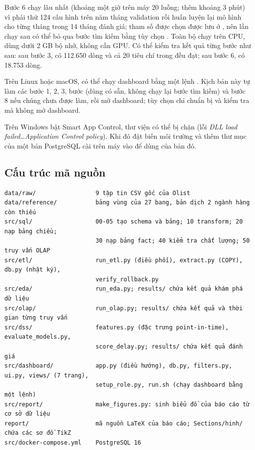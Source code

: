 Bước 6 chạy lâu nhất (khoảng một giờ trên máy 20 luồng;  thêm khoảng 3 phút) vì phải thử 124 cấu hình trên năm tháng validation rồi huấn luyện lại mô hình cho từng tháng trong 14 tháng đánh giá; tham số được chọn được lưu ở , nên lần chạy sau có thể bỏ qua bước tìm kiếm bằng tùy chọn . Toàn bộ chạy trên CPU, dùng dưới 2 GB bộ nhớ, không cần GPU. Có thể kiểm tra kết quả từng bước như sau: sau bước 3,  có 112.650 dòng và cả 20 tiêu chí trong  đều đạt; sau bước 6,  có 18.753 dòng.

Trên Linux hoặc macOS, có thể chạy dashboard bằng một lệnh . Kịch bản này tự làm các bước 1, 2, 3, bước  (dùng  có sẵn, không chạy lại bước tìm kiếm) và bước 8 nếu chúng chưa được làm, rồi mở dashboard; tùy chọn  chỉ chuẩn bị và kiểm tra mà không mở dashboard.

Trên Windows bật Smart App Control, thư viện  có thể bị chặn (lỗi \textit{DLL load failed\ldots Application Control policy}). Khi đó đặt biến môi trường  và thêm thư mục  của một bản PostgreSQL cài trên máy vào  để dùng  của bản đó.

\subsection{Cấu trúc mã nguồn}

\begin{lstlisting}[style=SQLStyle, language={}]
data/raw/                 9 tập tin CSV gốc của Olist
data/reference/           bảng vùng của 27 bang, bản dịch 2 ngành hàng còn thiếu
src/sql/                  00-05 tạo schema và bảng; 10 transform; 20 nạp bảng chiều;
                          30 nạp bảng fact; 40 kiểm tra chất lượng; 50 truy vấn OLAP
src/etl/                  run_etl.py (điều phối), extract.py (COPY), db.py (nhật ký),
                          verify_rollback.py
src/eda/                  run_eda.py; results/ chứa kết quả khám phá dữ liệu
src/olap/                 run_olap.py; results/ chứa kết quả và thời gian từng truy vấn
src/dss/                  features.py (đặc trưng point-in-time), evaluate_models.py,
                          score_delay.py; results/ chứa kết quả đánh giá
src/dashboard/            app.py (điều hướng), db.py, filters.py, ui.py, views/ (7 trang),
                          setup_role.py, run.sh (chạy dashboard bằng một lệnh)
src/report/               make_figures.py: sinh biểu đồ của báo cáo từ cơ sở dữ liệu
report/                   mã nguồn LaTeX của báo cáo; Sections/hinh/ chứa các sơ đồ TikZ
src/docker-compose.yml    PostgreSQL 16
\end{lstlisting}

